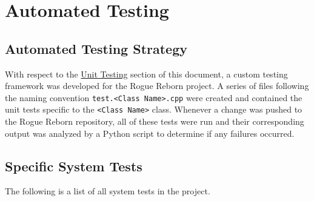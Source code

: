\documentclass[12pt, titlepage]{article}
\newcommand{\newsection}[1]{\newpage\section{#1}}
\begin{document}
\newsection{Automated Testing} \label{Section_Automated}

	\subsection{Automated Testing Strategy}
	With respect to the \hyperref[Section_UT]{Unit Testing} section of this document, a custom testing framework was developed for the Rogue Reborn project.  A series of files following the naming convention \lstinline$test.<Class Name>.cpp$ were created and contained the unit tests specific to the \lstinline$<Class Name>$ class.  Whenever a change was pushed to the Rogue Reborn repository, all of these tests were run and their corresponding output was analyzed by a Python script to determine if any failures occurred.

	\subsection{Specific System Tests}
	The following is a list of all system tests in the project.
\end{document}
